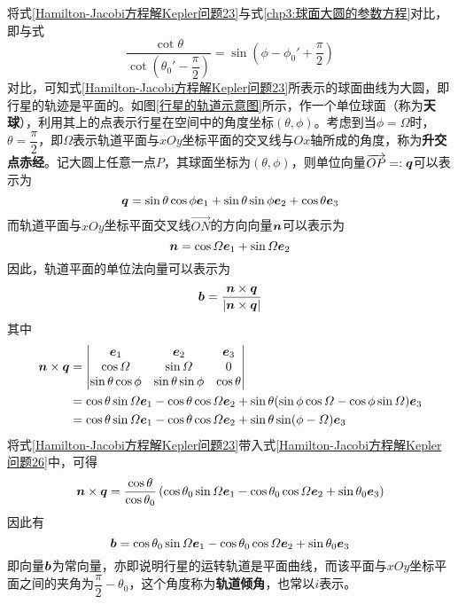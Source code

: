 将式\eqref{Hamilton-Jacobi方程解Kepler问题23}与式\eqref{chp3:球面大圆的参数方程}对比，即与式
\begin{equation}
	\frac{\cot\theta}{\cot\left(\theta_0'-\dfrac{\pi}{2}\right)} = \sin\left(\phi-\phi_0'+\frac{\pi}{2}\right)
	\label{Hamilton-Jacobi方程解Kepler问题24}
\end{equation}
对比，可知式\eqref{Hamilton-Jacobi方程解Kepler问题23}所表示的球面曲线为大圆，即行星的轨迹是平面的。如图\ref{行星的轨道示意图}所示，作一个单位球面（称为{\bf 天球}），利用其上的点表示行星在空间中的角度坐标$(\theta,\phi)$。考虑到当$\phi=\varOmega$时，$\theta=\dfrac{\pi}{2}$，即$\varOmega$表示轨道平面与$xOy$坐标平面的交叉线与$Ox$轴所成的角度，称为{\bf 升交点赤经}。记大圆上任意一点$P$，其球面坐标为$(\theta,\phi)$，则单位向量$\overrightarrow{OP}=:\boldsymbol{q}$可以表示为
\begin{equation}
	\boldsymbol{q} = \sin\theta\cos\phi\boldsymbol{e}_1+\sin\theta\sin\phi\boldsymbol{e}_2+\cos\theta\boldsymbol{e}_3
	\label{Hamilton-Jacobi方程解Kepler问题24-q}
\end{equation}
而轨道平面与$xOy$坐标平面交叉线$\overrightarrow{ON}$的方向向量$\boldsymbol{n}$可以表示为
\begin{equation}
	\boldsymbol{n} = \cos\varOmega\boldsymbol{e}_1+\sin\varOmega\boldsymbol{e}_2
	\label{Hamilton-Jacobi方程解Kepler问题24-n}
\end{equation}
因此，轨道平面的单位法向量可以表示为
\begin{equation}
	\boldsymbol{b} = \frac{\boldsymbol{n}\times \boldsymbol{q}}{|\boldsymbol{n}\times \boldsymbol{q}|}
	\label{Hamilton-Jacobi方程解Kepler问题25}
\end{equation}
其中
\begin{align}
	\boldsymbol{n}\times \boldsymbol{q} & = \begin{vmatrix} \boldsymbol{e}_1 & \boldsymbol{e}_2 & \boldsymbol{e}_3 \\ \cos\varOmega & \sin\varOmega & 0 \\ \sin\theta\cos\phi & \sin\theta\sin\phi & \cos\theta \end{vmatrix} \nonumber \\
	& = \cos\theta\sin\varOmega\boldsymbol{e}_1 - \cos\theta\cos\varOmega\boldsymbol{e}_2+\sin\theta(\sin\phi\cos\varOmega-\cos\phi\sin\varOmega)\boldsymbol{e}_3 \nonumber \\
	& = \cos\theta\sin\varOmega\boldsymbol{e}_1 - \cos\theta\cos\varOmega\boldsymbol{e}_2+\sin\theta\sin(\phi-\varOmega)\boldsymbol{e}_3
	\label{Hamilton-Jacobi方程解Kepler问题26}
\end{align}
将式\eqref{Hamilton-Jacobi方程解Kepler问题23}带入式\eqref{Hamilton-Jacobi方程解Kepler问题26}中，可得
\begin{equation}
	\boldsymbol{n}\times \boldsymbol{q} = \frac{\cos\theta}{\cos\theta_0}\left(\cos\theta_0\sin\varOmega\boldsymbol{e}_1-\cos\theta_0\cos\varOmega\boldsymbol{e}_2+\sin\theta_0\boldsymbol{e}_3\right)
	\label{Hamilton-Jacobi方程解Kepler问题27}
\end{equation}
因此有
\begin{equation}
	\boldsymbol{b} = \cos\theta_0\sin\varOmega\boldsymbol{e}_1-\cos\theta_0\cos\varOmega\boldsymbol{e}_2+\sin\theta_0\boldsymbol{e}_3
	\label{Hamilton-Jacobi方程解Kepler问题28}
\end{equation}
即向量$\boldsymbol{b}$为常向量，亦即说明行星的运转轨道是平面曲线，而该平面与$xOy$坐标平面之间的夹角为$\dfrac{\pi}{2}-\theta_0$，这个角度称为{\bf 轨道倾角}，也常以$i$表示。

